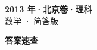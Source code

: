 \documentclass[zihao=-4, a4paper]{ctexart}
\begin{document}
\begin{center}
  {\Large\bfseries 2013 年·北京卷·理科}\\[4pt]
  {\large 数学 · 简答版}
\end{center}
\medskip
{}

\clearpage
{}
\begin{center}{\Large\bfseries 答案速查}\end{center}
\medskip

\end{document}
